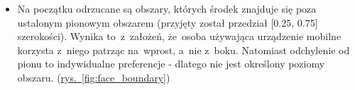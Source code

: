 \begin{itemize}
    \item Na początku odrzucane są obszary, których środek znajduje się poza ustalonym pionowym obszarem (przyjęty został przedział [0.25, 0.75] szerokości). Wynika to~z~założeń, że~osoba używająca urządzenie mobilne korzysta z~niego patrząc na~wprost, a~nie z~boku. Natomiast odchylenie od pionu to indywidualne preferencje - dlatego nie jest określony poziomy obszaru. (\hyperref[{fig:face_boundary}]{rys.~\ref{fig:face_boundary}})

    \begin{figure}[!h]
        \begin{center}
            \hspace{8mm}

\end{center}
\end{figure}
\end{itemize}
